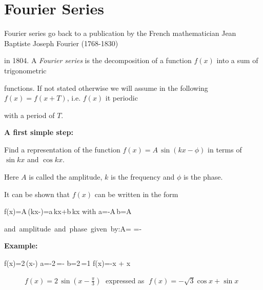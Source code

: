 




\section{Fourier Series}

Fourier series go back to a publication by the French mathematician Jean Baptiste Joseph Fourier (1768-1830)

in 1804. A \emph{Fourier series} is the decomposition of a function $f(x)$ into a sum of trigonometric

functions. If not stated otherwise we will assume in the following $f(x)=f(x+T)$, i.e. $f(x)$ it periodic

with a period of $T$.\svs



{\bf A first simple step:}



Find a representation of the function $f(x)= A\,\sin(kx-\phi)$ in terms of $\sin kx$ and $\cos kx$.

Here $A$ is called the amplitude, $k$ is the frequency and $\phi$ is the phase.



It can be shown that $f(x)$ can be written in the form

\bnn f(x)=A\,\sin(kx-\phi)=a\,\cos kx+b\,\sin kx \qquad\mbox{with} \qquad a=-A\,\sin\phi \qquad b=A\,\cos\phi \enn

\bnn \mbox{and amplitude and phase given by:}\qquad A= \qquad \phi=-\arctan{} \enn \svs



{\bf Example:}

\bnn  
    f(x)=2\,\sin(x-) \quad \rightarrow \quad a=-2\,\sin{}=- \quad b=2\,\cos{}=1
    \quad \rightarrow \quad f(x)=-\cos x + \sin x
\enn



\begin{figure}[!h]

    \centerline{\epsfxsize=12cm \epsfysize=8cm  } \svs

    \caption{$f(x)=2\,\sin(x-\frac{\pi}{3})\;$ expressed as $\;f(x)=-\sqrt{3}\cos x + \sin x$}  \label{fig52}

\end{figure} \vs





